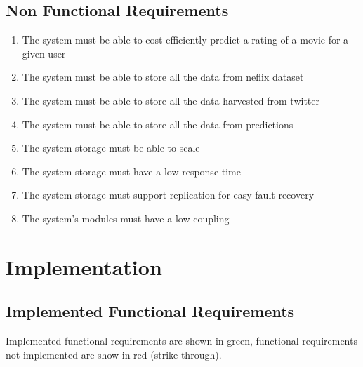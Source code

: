 \section{Non Functional Requirements}
\begin{enumerate}[label=\bfseries NFR \arabic*:]
  \item The system must be able to cost efficiently predict a rating of a movie for a given user
  \item The system must be able to store all the data from neflix dataset
  \item The system must be able to store all the data harvested from twitter
  \item The system must be able to store all the data from predictions
  \item The system storage must be able to scale
  \item The system storage must have a low response time
  \item The system storage must support replication for easy fault recovery
  \item The system's modules must have a low coupling
\end{enumerate}




\chapter{Implementation}\label{app:impl}
\section{Implemented Functional Requirements}
Implemented functional requirements are shown in green, functional requirements not implemented are show in red (strike-through).

